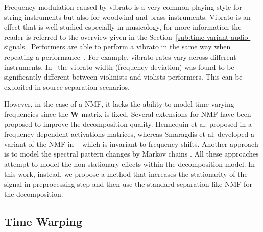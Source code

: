 Frequency modulation caused by vibrato is a very common playing style for string instruments but also for woodwind and brass instruments.
Vibrato is an effect that is well studied especially in musicology, for more information the reader is referred to the overview given in the Section~\ref{sub:time-variant-audio-signals}.
Performers are able to perform a vibrato in the same way when repeating a performance~\cite{fletcher01}.
For example, vibrato rates vary across different instruments.
In~\cite{macleod06} the vibrato width (frequency deviation) was found to be significantly different between violinists and violists performers.
This can be exploited in source separation scenarios.
\par
However, in the case of a NMF, it lacks the ability to model time varying frequencies since the $\mathbf{W}$ matrix is fixed.
Several extensions for NMF have been proposed to improve the decomposition quality.
Hennequin et al. proposed in \cite{hennequin11} a frequency dependent activations matrices, whereas Smaragdis et al. developed a variant of the NMF in ~\cite{smaragdis08} which is invariant to frequency shifts.
Another approach is to model the spectral pattern changes by Markov chains \cite{nakano10}. All these approaches attempt to model the non-stationary effects within the decomposition model.
In this work, instead, we propose a method that increases the stationarity of the signal in preprocessing step and then use the standard separation like NMF for the decomposition.\\

\subsection{Time Warping}
\label{sub:time_warping}

